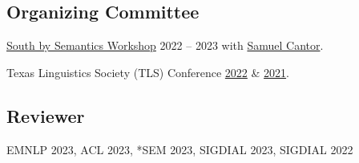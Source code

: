 \subsection{Organizing Committee}

\quad \href{https://sites.utexas.edu/sxsemantics}{South by Semantics Workshop} 2022 -- 2023 with \href{https://www.cantwolf.com}{Samuel Cantor}.

\quad Texas Linguistics Society (TLS) Conference \href{http://tls.ling.utexas.edu/2022/}{2022} \& \href{http://tls.ling.utexas.edu/2021/}{2021}.

\subsection{Reviewer}

\quad EMNLP 2023, ACL 2023, *SEM 2023, SIGDIAL 2023, SIGDIAL 2022
